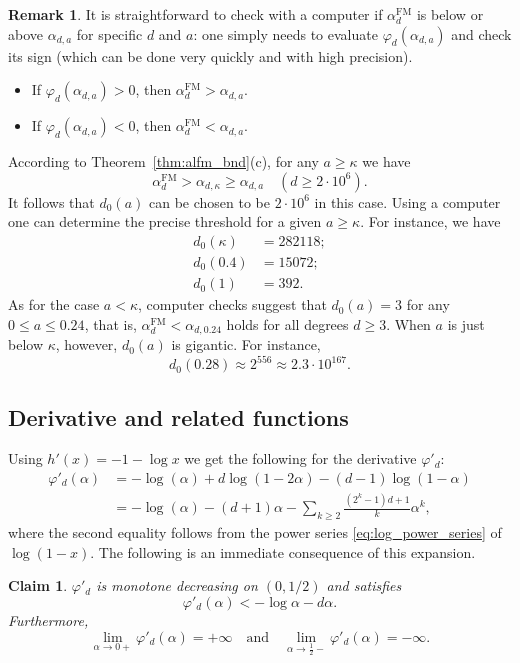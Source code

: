 \documentclass[12pt]{amsart}
\newtheorem{claim}[theorem]{Claim}
\theoremstyle{definition}
\newtheorem{remark}[theorem]{Remark}
\newcommand\al{\alpha}
\newcommand\ka{\kappa}
\newcommand\alfm{\alpha^{\mathrm{FM}}}
\begin{document}
%
\begin{remark}
It is straightforward to check with a computer if $\alfm_d$ is below or above $\al_{d,a}$ for specific $d$ and $a$: one simply needs to evaluate $\varphi_d(\al_{d,a})$ and check its sign (which can be done very quickly and with high precision).
%
\begin{itemize}
\item If $\varphi_d(\al_{d,a})>0$, then $\alfm_d>\al_{d,a}$.
\item If $\varphi_d(\al_{d,a})<0$, then $\alfm_d<\al_{d,a}$.
\end{itemize}
%
According to Theorem~\ref{thm:alfm_bnd}(c), for any $a \geq \ka$ we have 
%
\[ \alfm_d > \al_{d,\ka} \geq \al_{d,a} 
\quad (d \geq 2 \cdot 10^6) .\]
%
It follows that $d_0(a)$ can be chosen to be $2 \cdot 10^6$ in this case. Using a computer one can determine the precise threshold for a given $a \geq \ka$. For instance, we have 
%
%
\begin{align*}
d_0(\ka) &= 282118 ;\\
d_0(0.4) &= 15072 ;\\
d_0(1) &= 392 .
\end{align*}
%
As for the case $a<\ka$, computer checks suggest that $d_0(a)=3$ for any $0 \leq a \leq 0.24$, that is, $\alfm_d < \al_{d,0.24}$ holds for all degrees $d \geq 3$. When $a$ is just below $\ka$, however, $d_0(a)$ is gigantic. For instance, 
%
\[ d_0(0.28) \approx 2^{556} \approx 2.3 \cdot 10^{167} .\]
%
\end{remark}
%

%
\subsection{Derivative and related functions}
%
Using $h'(x)=-1-\log x$ we get the following for the derivative $\varphi'_d$:
%
\begin{align*}
\varphi'_d(\al) 
&= -\log(\al) + d \log(1-2\al) - (d-1) \log(1-\al) \\
&= -\log(\al) - (d+1) \al 
- \sum_{k \geq 2} \frac{(2^k-1)d+1}{k}\al^k ,
\end{align*}
%
where the second equality follows from the power series \eqref{eq:log_power_series} of $\log(1-x)$. The following is an immediate consequence of this expansion.
%
\begin{claim} \label{cl:phi_der}
$\varphi'_d$ is monotone decreasing on $(0,1/2)$ and satisfies 
%
\[ \varphi'_d(\al) < -\log \al - d\al . \]
%
Furthermore,
%
\[ \lim_{\al \to 0+ } \varphi'_d(\al) = +\infty 
\quad \text{and} \quad 
\lim_{\al \to \frac 12 - } \varphi'_d(\al) = -\infty .\]
%
\end{claim}
%
\end{document}
